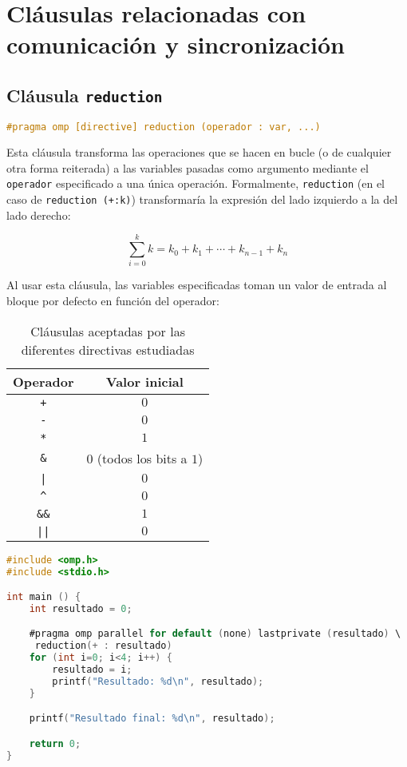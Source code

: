 \section{Cláusulas relacionadas con comunicación y sincronización}

\subsection{Cláusula \texttt{reduction}}

\begin{lstlisting}[language=C]
#pragma omp [directive] reduction (operador : var, ...)
\end{lstlisting}

Esta cláusula transforma las operaciones que se hacen en bucle (o de cualquier otra forma reiterada) a las variables pasadas como argumento mediante el \texttt{operador} especificado a una única operación.
Formalmente, \texttt{reduction} (en el caso de \texttt{reduction (+:k)}) transformaría la expresión del lado izquierdo a la del lado derecho:

\[\sum_{i=0}^{k}k=k_0+k_1+\cdots+k_{n-1}+k_n\]

Al usar esta cláusula, las variables especificadas toman un valor de entrada al bloque por defecto en función del operador:

\begin{table}[!h]
	\begin{center}
		\begin{tabular}{c c}
			\textbf{Operador} & \textbf{Valor inicial} \\
			\toprule
			\texttt{+} & $0$ \\
			\texttt{-} & $0$ \\
			\texttt{*} & $1$ \\
			\texttt{\&} & $0$ (todos los bits a $1$) \\
			\texttt{|} & $0$ \\
			\texttt{\^{}} & $0$ \\
			\texttt{\&\&} & $1$ \\
			\texttt{||} & $0$ \\
		\end{tabular}
	\end{center}
	\caption{Cláusulas aceptadas por las diferentes directivas estudiadas}\label{clausulas-omp-definiciones-aceptacion}
\end{table}

\begin{lstlisting}[language=C]
#include <omp.h>
#include <stdio.h>

int main () {
	int resultado = 0;

	#pragma omp parallel for default (none) lastprivate (resultado) \
	 reduction(+ : resultado)
	for (int i=0; i<4; i++) {
		resultado = i;
		printf("Resultado: %d\n", resultado);
	}

	printf("Resultado final: %d\n", resultado);

	return 0;
}
\end{lstlisting}

